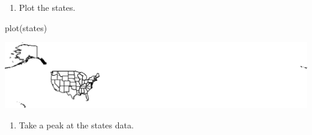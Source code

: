 \documentclass[
]{book}
\newenvironment{Shaded}{\begin{snugshade}}{\end{snugshade}}
\newcommand{\FunctionTok}[1]{\textcolor[rgb]{0.00,0.00,0.00}{#1}}
\newcommand{\NormalTok}[1]{#1}
\providecommand{\tightlist}{%
  \setlength{\itemsep}{0pt}\setlength{\parskip}{0pt}}
\begin{document}
\begin{enumerate}
\def\labelenumi{\arabic{enumi}.}
\setcounter{enumi}{10}
\tightlist
\item
  Plot the states.
\end{enumerate}

\begin{Shaded}
\begin{Highlighting}[]
\FunctionTok{plot}\NormalTok{(states)}
\end{Highlighting}
\end{Shaded}

\includegraphics{figures/unnamed-chunk-419-1.pdf}

\begin{enumerate}
\def\labelenumi{\arabic{enumi}.}
\setcounter{enumi}{11}
\tightlist
\item
  Take a peak at the states data.
\end{enumerate}
\end{document}
